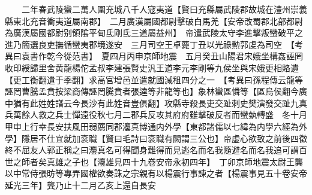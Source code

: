 　　二年春武陵蠻二萬人圍充城八千人寇夷道【賢曰充縣屬武陵郡故城在澧州崇義縣東北充音衝夷道屬南郡】　二月廣漢屬國都尉擊破白馬羌【安帝改蜀郡北部都尉為廣漢屬國都尉别領隂平甸氐剛氐三道屬益州】　帝遣武陵太守李進擊叛蠻破平之進乃簡選良吏撫循蠻夷郡境遂安　三月司空王卓薨丁丑以光祿勲郭䖍為司空　【考異曰袁書作乾今從范書】　夏四月丙申京師地震　五月癸丑山陽君宋娥坐構姦誣罔收印綬歸里舍黄龍楊佗孟叔李建張賢史汎王道李元李剛等九侯坐與宋娥更相賂遺【更工衡翻遺于季翻】求高官增邑並遣就國減租四分之一　【考異曰孫程傳云龍等誣罔曹騰孟賁按梁商傳誣罔騰賁者張逵等非龍等也】象林蠻區憐等【區烏侯翻今廣中猶有此姓姓譜云今長沙有此姓音豈俱翻】攻縣寺殺長吏交趾刺史樊演發交趾九真兵萬餘人救之兵士憚遠役秋七月二郡兵反攻其府府雖擊破反者而蠻埶轉盛　冬十月甲申上行幸長安扶風田弱薦同郡灋真博通内外學【東都諸儒以七緯為内學六經為外學】隱居不仕宜就加衮職【賢曰毛詩曰衮職有闕謂三公也】帝虚心欲致之前後四徵終不屈友人郭正稱之曰灋真名可得聞身難得而見逃名而名我隨避名而名我追可謂百世之師者矣真雄之子也【灋雄見四十九卷安帝永初四年】　丁卯京師地震太尉王龔以中常侍張昉等專弄國權欲奏誅之宗親有以楊震行事諫之者【楊震事見五十卷安帝延光三年】龔乃止十二月乙亥上還自長安

